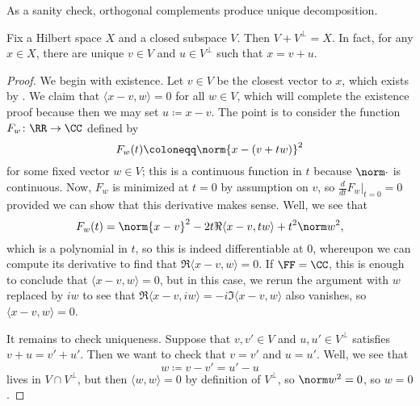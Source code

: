 \documentclass[../notes.tex]{subfiles}
\begin{document}
As a sanity check, orthogonal complements produce unique decomposition.
\begin{proposition} \label{prop:ortho-decompose}
	Fix a Hilbert space $X$ and a closed subspace $V$. Then $V+V^\perp=X$. In fact, for any $x\in X$, there are unique $v\in V$ and $u\in V^\perp$ such that $x=v+u$.
\end{proposition}
\begin{proof}
	We begin with existence. Let $v\in V$ be the closest vector to $x$, which exists by . We claim that $\langle x-v,w\rangle=0$ for all $w\in V$, which will complete the existence proof because then we may set $u\coloneqq x-v$. The point is to consider the function $F_w\colon\RR\to\CC$ defined by
	\[F_w(t)\coloneqq\norm{x-(v+tw)}^2\]
	for some fixed vector $w\in V$; this is a continuous function in $t$ because $\norm\cdot$ is continuous. Now, $F_w$ is minimized at $t=0$ by assumption on $v$, so $\frac d{dt}F_w\big|_{t=0}=0$ provided we can show that this derivative makes sense. Well, we see that
	\[F_w(t)=\norm{x-v}^2-2t\Re\langle x-v,tw\rangle+t^2\norm w^2,\]
	which is a polynomial in $t$, so this is indeed differentiable at $0$, whereupon we can compute its derivative to find that $\Re\langle x-v,w\rangle=0$. If $\FF=\CC$, this is enough to conclude that $\langle x-v,w\rangle=0$, but in this case, we rerun the argument with $w$ replaced by $iw$ to see that $\Re\langle x-v,iw\rangle=-i\Im\langle x-v,w\rangle$ also vanishes, so $\langle x-v,w\rangle=0$.

	It remains to check uniqueness. Suppose that $v,v'\in V$ and $u,u'\in V^\perp$ satisfies $v+u=v'+u'$. Then we want to check that $v=v'$ and $u=u'$. Well, we see that
	\[w\coloneqq v-v'=u'-u\]
	lives in $V\cap V^\perp$, but then $\langle w,w\rangle=0$ by definition of $V^\perp$, so $\norm w^2=0$, so $w=0$.
\end{proof}
\end{document}
